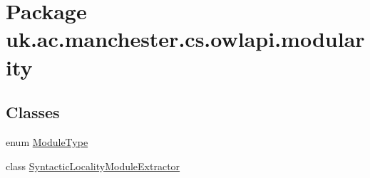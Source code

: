 \hypertarget{namespaceuk_1_1ac_1_1manchester_1_1cs_1_1owlapi_1_1modularity}{\section{Package uk.\-ac.\-manchester.\-cs.\-owlapi.\-modularity}
\label{namespaceuk_1_1ac_1_1manchester_1_1cs_1_1owlapi_1_1modularity}
}
\subsection*{Classes}
\begin{DoxyCompactItemize}
\item 
enum \hyperlink{enumuk_1_1ac_1_1manchester_1_1cs_1_1owlapi_1_1modularity_1_1_module_type}{Module\-Type}
\item 
class \hyperlink{classuk_1_1ac_1_1manchester_1_1cs_1_1owlapi_1_1modularity_1_1_syntactic_locality_module_extractor}{Syntactic\-Locality\-Module\-Extractor}
\end{DoxyCompactItemize}
